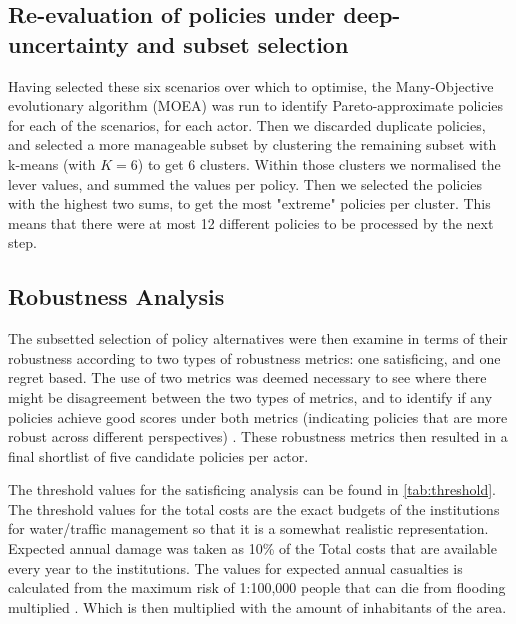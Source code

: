 \subsection{Re-evaluation of policies under deep-uncertainty and subset selection}
Having selected these six scenarios over which to optimise, the Many-Objective evolutionary algorithm (MOEA) was run to identify Pareto-approximate policies for each of the scenarios, for each actor. Then we discarded duplicate policies, and selected a more manageable subset by clustering the remaining subset with k-means (with $K=6$) to get 6 clusters. Within those clusters we normalised the lever values, and summed the values per policy. Then we selected the policies with the highest two sums, to get the most "extreme" policies per cluster. This means that there were at most 12 different policies to be processed by the next step.

\subsection{Robustness Analysis}
The subsetted selection of policy alternatives were then examine in terms of their robustness according to two types of robustness metrics: one satisficing, and one regret based. The use of two metrics was deemed necessary to see where there might be disagreement between the two types of metrics, and to identify if any policies achieve good scores under both metrics (indicating  policies that are more robust across different perspectives) \parencite{mcphail_robustness_2018}. These robustness metrics then resulted in a final shortlist of five candidate policies per actor.

The threshold values for the satisficing analysis can be found in \autoref{tab:threshold}. The threshold values for the total costs are the exact budgets of the institutions for water/traffic management so that it is a somewhat realistic representation. Expected annual damage was taken as 10\% of the Total costs that are available every year to the institutions. The values for expected annual casualties is calculated from the maximum risk of 1:100,000 people that can die from flooding multiplied \parencite{slootjes_achtergronden_2016} . Which is then multiplied with the amount of inhabitants of the area.


